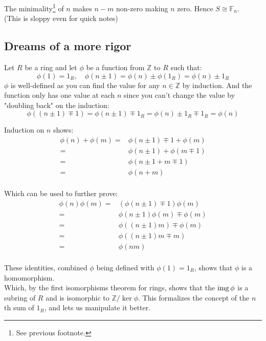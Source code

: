 The minimality\footnote{See previous footnote.} of $n$ makes $n-m$ non-zero making $n$ zero.
Hence $S\cong\mathbb{F}_{n}$.
\\

(This is sloppy even for quick notes)

\subsection{Dreams of a more rigor}
Let $R$ be a ring and let $\phi$ be a function from $\mathbb{Z}$ to $R$ such that:
\[\phi(1)=1_R,\quad \phi(n\pm 1) = \phi(n)\pm \phi(1_R)= \phi(n)\pm 1_R\]
$\phi$ is well-defined as you can find the value for any $n\in\mathbb{Z}$ by induction.
And the function only has one value at each $n$ since you can't change the value by "doubling back" on the induction:
\[\phi((n\pm 1)\mp 1) = \phi(n\pm 1)\mp 1_R = \phi(n)\pm 1_R\mp 1_R = \phi(n)\]

Induction on $n$ shows:
\begin{equation*}
\begin{aligned}
	\phi(n)+\phi(m) =& \phi(n\pm 1)\mp 1 +\phi(m) \\
	=& \phi(n\pm 1)+\phi(m\mp 1) \\
	=& \phi(n\pm 1 + m\mp 1) \\
	=& \phi(n+m) \\
\end{aligned}
\end{equation*}

Which can be used to further prove:
\begin{equation*}
\begin{aligned}
	\phi(n)\phi(m) =&(\phi(n\pm 1)\mp 1)\phi(m) \\
	=&\phi(n\pm 1)\phi(m)\mp\phi(m) \\
	=&\phi((n\pm 1)m)\mp\phi(m) \\
	=&\phi((n\pm 1)m\mp m) \\
	=&\phi(nm)\\
\end{aligned}
\end{equation*}

These identities,
combined $\phi$ being defined with $\phi(1)=1_R$,
shows that $\phi$ is a homomorphism.
\\

Which, 
by the first isomorphisms theorem for rings,
shows that the $\operatorname{img}\phi$ is a subring of $R$ and is isomorphic to $\mathbb{Z}/\ker \phi$.
This formalizes the concept of the $n$th sum of $1_R$,
and lets us manipulate it better.
\\

